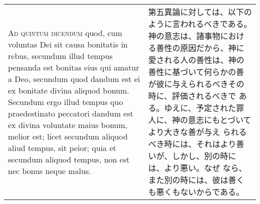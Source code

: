 \documentclass[10pt]{jsarticle} %
\begin{document}
\begin{longtable}{p{21em}p{21em}}
\\


{\scshape Ad quintum dicendum} quod, cum voluntas Dei sit causa
 bonitatis in rebus, secundum illud tempus pensanda est bonitas eius qui
 amatur a Deo, secundum quod dandum est ei ex bonitate divina aliquod
 bonum. Secundum ergo illud tempus quo praedestinato peccatori dandum
 est ex divina voluntate maius bonum, melior est; licet secundum aliquod
 aliud tempus, sit peior; quia et secundum aliquod tempus, non est nec
 bonus neque malus.


&

第五異論に対しては、以下のように言われるべきである。
神の意志は、諸事物における善性の原因だから、神に愛される人の善性は、神の
 善性に基づいて何らかの善が彼に与えられるべきその時に、評価されるべきで
 ある。ゆえに、予定された罪人に、神の意志にもとづいてより大きな善が与え
 られるべき時には、それはより善いが、しかし、別の時には、より悪い。なぜ
 なら、また別の時には、彼は善くも悪くもないからである。




\end{longtable}
\newpage
\end{document}
